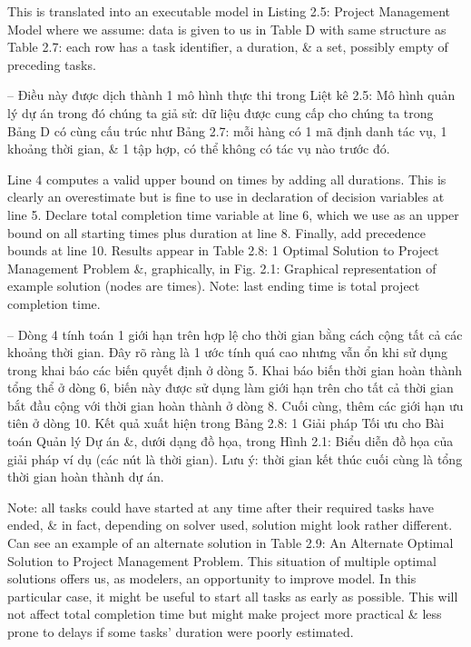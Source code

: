 \documentclass{article}
\begin{document}
\begin{itemize}
\begin{itemize}
\begin{itemize}
            This is translated into an executable model in {\sf Listing 2.5: Project Management Model} where we assume: data is given to us in Table D with same structure as Table 2.7: each row has a task identifier, a duration, \& a set, possibly empty of preceding tasks.

            -- Điều này được dịch thành 1 mô hình thực thi trong {\sf Liệt kê 2.5: Mô hình quản lý dự án} trong đó chúng ta giả sử: dữ liệu được cung cấp cho chúng ta trong Bảng D có cùng cấu trúc như Bảng 2.7: mỗi hàng có 1 mã định danh tác vụ, 1 khoảng thời gian, \& 1 tập hợp, có thể không có tác vụ nào trước đó.

            Line 4 computes a valid upper bound on times by adding all durations. This is clearly an overestimate but is fine to use in declaration of decision variables at line 5. Declare total completion time variable at line 6, which we use as an upper bound on all starting times plus duration at line 8. Finally, add precedence bounds at line 10. Results appear in {\sf Table 2.8: 1 Optimal Solution to Project Management Problem} \&, graphically, in {\sf Fig. 2.1: Graphical representation of example solution (nodes are times).} Note: last ending time is total project completion time.

            -- Dòng 4 tính toán 1 giới hạn trên hợp lệ cho thời gian bằng cách cộng tất cả các khoảng thời gian. Đây rõ ràng là 1 ước tính quá cao nhưng vẫn ổn khi sử dụng trong khai báo các biến quyết định ở dòng 5. Khai báo biến thời gian hoàn thành tổng thể ở dòng 6, biến này được sử dụng làm giới hạn trên cho tất cả thời gian bắt đầu cộng với thời gian hoàn thành ở dòng 8. Cuối cùng, thêm các giới hạn ưu tiên ở dòng 10. Kết quả xuất hiện trong {\sf Bảng 2.8: 1 Giải pháp Tối ưu cho Bài toán Quản lý Dự án} \&, dưới dạng đồ họa, trong {\sf Hình 2.1: Biểu diễn đồ họa của giải pháp ví dụ (các nút là thời gian).} Lưu ý: thời gian kết thúc cuối cùng là tổng thời gian hoàn thành dự án.

            Note: all tasks could have started at any time after their required tasks have ended, \& in fact, depending on solver used, solution might look rather different. Can see an example of an alternate solution in {\sf Table 2.9: An Alternate Optimal Solution to Project Management Problem}. This situation of multiple optimal solutions offers us, as modelers, an opportunity to improve model. In this particular case, it might be useful to start all tasks as early as possible. This will not affect total completion time but might make project more practical \& less prone to delays if some tasks' duration were poorly estimated.


\end{itemize}
\end{itemize}
\end{itemize}
\end{document}
